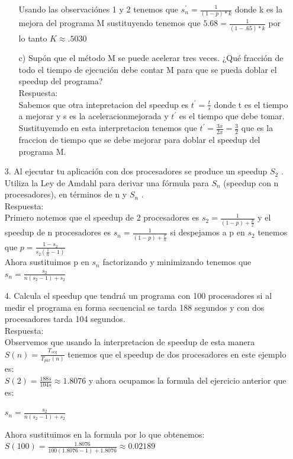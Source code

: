 \documentclass[12pt, letterpaper]{article}
\begin{document}
\begin{itemize}
\begin{itemize}
	Usando las observaci\'ones 1 y 2 tenemos que $s_{n}^{'} =  \frac{1}{(1-p)*k}$ donde k es la mejora del programa M sustituyendo tenemos que $5.68 = \frac{1}{(1-.65)*k}$ por lo tanto $K \approx.5030$\\
	
	\item[c)]{Sup\'on que el m\'etodo M se puede acelerar tres veces. ¿Qué fracci\'on de todo el tiempo de ejecuci\'on debe contar M para que se pueda doblar el speedup del programa?}\\
	
	Respuesta:\\
	Sabemos que otra intepretacion del speedup es $t^{'} = \frac{t}{s}$ donde t es el tiempo a mejorar y s es la aceleracionmejorada y $t^{'}$ es el tiempo que debe tomar. Sustituyemdo en esta interpretacion tenemos que $t^{'} = \frac{3x}{2x} = \frac{3}{2}$ que es la fraccion de tiempo que se debe mejorar para doblar el speedup del programa M.
	
\end{itemize}

\item[3. ]Al ejecutar tu aplicaci\'on con dos procesadores se produce un speedup $S_{2}$ . Utiliza la Ley de Amdahl para derivar una f\'ormula para $S_{n}$ (speedup con n procesadores), en t\'erminos de n y $S_{n}$ .\\
Respuesta:\\
Primero notemos que el speedup de 2 procesadores es $s_{2} = \frac{1}{(1-p)+\frac{p}{2}}$ y el speedup de n procesadores es $s_{n} = \frac{1}{(1-p)+ \frac{p}{n}}$ si despejamos a p en $s_{2}$ tenemos que $p = \frac{1-s_{2}}{s_{2}(\frac{1}{n}-1)}$\\
Ahora sustituimos p en $s_{n}$ factorizando y minimizando tenemos que $s_{n}=\frac{s_{2}}{n(s_{2}-1)+s_{2}}$
\item[4. ]Calcula el speedup que tendrı\'a un programa con 100 procesadores si al medir el programa en forma secuencial se tarda 188 segundos y con dos procesadores tarda 104 segundos.\\
Respuesta:\\
Observemos que usando la interpretacion de speedup de esta manera $S(n)=\frac{T_{seq}}{T_{par}(n)}$
tenemos que el speedup de dos procesadores en este ejemplo es:\\ 
$S(2) = \frac{188s}{104s} \approx 1.8076$ y ahora ocupamos la formula del ejercicio anterior que es: 
\begin{center}
$s_{n}=\frac{s_{2}}{n(s_{2}-1)+s_{2}}$ \\
\end{center}
Ahora sustituimos en la formula por lo que obtenemos:\\
$S(100) =\frac{1.8076}{100(1.8076-1)+1.8076}\approx 0.02189$ 


\end{itemize}
\end{document}
